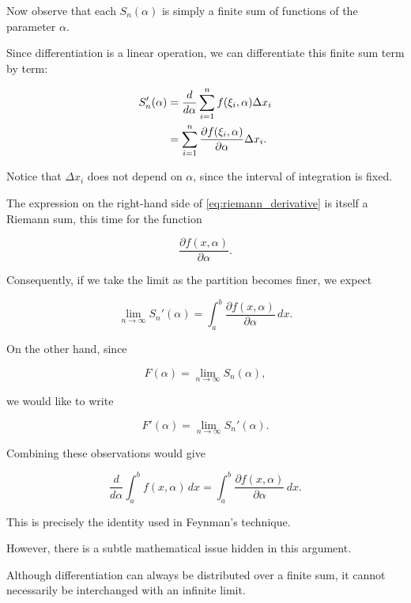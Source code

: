 \documentclass[11pt,a4paper]{article}
\theoremstyle{definition}
\theoremstyle{remark}
\begin{document}
Now observe that each
$S_n(\alpha)$ is simply
a finite sum of functions
of the parameter $\alpha$.

Since differentiation is
a linear operation,
we can differentiate
this finite sum term
by term:

\begin{align}
    S_n'(\alpha)
    &=
    \frac{d}{d\alpha}
    \sum_{i=1}^{n}
    f(\xi_i,\alpha)\Delta x_i
    \notag\\
    &=
    \sum_{i=1}^{n}
    \frac{\partial f(\xi_i,\alpha)}
         {\partial\alpha}
    \Delta x_i.
    \label{eq:riemann_derivative}
\end{align}

Notice that $\Delta x_i$
does not depend on $\alpha$,
since the interval of
integration is fixed.

The expression on the
right-hand side of
\eqref{eq:riemann_derivative}
is itself a Riemann sum,
this time for the function

\[
    \frac{\partial f(x,\alpha)}
         {\partial\alpha}.
\]

Consequently, if we take
the limit as the partition
becomes finer, we expect

\begin{equation}
    \lim_{n\to\infty}
    S_n'(\alpha)
    =
    \int_a^b
    \frac{\partial f(x,\alpha)}
         {\partial\alpha}\,dx.
    \label{eq:riemann_derivative_limit}
\end{equation}

On the other hand, since

\[
    F(\alpha)
    =
    \lim_{n\to\infty}S_n(\alpha),
\]

we would like to write

\[
    F'(\alpha)
    =
    \lim_{n\to\infty}S_n'(\alpha).
\]

Combining these observations
would give

\[
    \boxed{
    \frac{d}{d\alpha}
    \int_a^b f(x,\alpha)\,dx
    =
    \int_a^b
    \frac{\partial f(x,\alpha)}
         {\partial\alpha}\,dx.
    }
\]

This is precisely the
identity used in Feynman's
technique.

\medskip

However, there is a subtle
mathematical issue hidden
in this argument.

Although differentiation
can always be distributed
over a finite sum, it
cannot necessarily be
interchanged with an
infinite limit.
\end{document}
